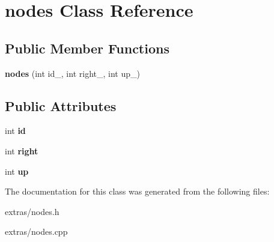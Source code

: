 \hypertarget{classnodes}{\section{nodes Class Reference}
\label{classnodes}
}
\subsection*{Public Member Functions}
\begin{DoxyCompactItemize}
\item 
\hypertarget{classnodes_acf6676c2566bb186d387cc38da318e97}{{\bfseries nodes} (int id\+\_\+, int right\+\_\+, int up\+\_\+)}\label{classnodes_acf6676c2566bb186d387cc38da318e97}

\end{DoxyCompactItemize}
\subsection*{Public Attributes}
\begin{DoxyCompactItemize}
\item 
\hypertarget{classnodes_a6aeb48db8e401867b7aa7dccf7e2b8be}{int {\bfseries id}}\label{classnodes_a6aeb48db8e401867b7aa7dccf7e2b8be}

\item 
\hypertarget{classnodes_a168e1539c084d5b0dbaf4312257ac190}{int {\bfseries right}}\label{classnodes_a168e1539c084d5b0dbaf4312257ac190}

\item 
\hypertarget{classnodes_af7055ca3c6bfc53e4821100b0ac8c19e}{int {\bfseries up}}\label{classnodes_af7055ca3c6bfc53e4821100b0ac8c19e}

\end{DoxyCompactItemize}


The documentation for this class was generated from the following files\+:\begin{DoxyCompactItemize}
\item 
extras/nodes.\+h\item 
extras/nodes.\+cpp\end{DoxyCompactItemize}
